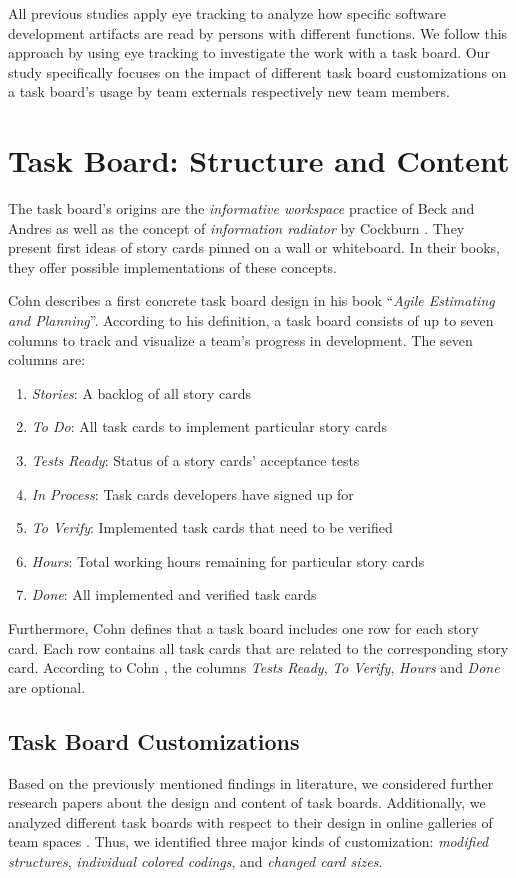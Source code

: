 \documentclass{llncs}
\begin{document}
All previous studies apply eye tracking to analyze how specific software 
development artifacts are read by persons with different functions. We follow 
this approach by using eye tracking to investigate the work with a task board. 
Our study specifically focuses on the impact of different task board 
customizations on a task board's usage by team externals respectively new team 
members.

\section{Task Board: Structure and Content}
\label{sec:task-board}
The task board's origins are the \textit{informative workspace} practice of Beck and Andres \cite{Beck.2007} as well as the concept of \textit{information radiator} by Cockburn \cite{Cockburn.2009}. They present first ideas of story cards pinned on a wall or whiteboard. In their books, they offer possible implementations of these concepts.

Cohn \cite{Cohn.2012} describes a first concrete task board design in his book 
``\textit{Agile Estimating and Planning}''. According to his definition, a task 
board consists of up to seven columns to track and visualize a team's progress 
in development. The seven columns are:
\begin{enumerate}
	\item \textit{Stories}: A backlog of all story cards
	\item \textit{To Do}: All task cards to implement particular story cards
	\item \textit{Tests Ready}: Status of a story cards' acceptance tests
	\item \textit{In Process}: Task cards developers have signed up for
	\item \textit{To Verify}: Implemented task cards that need to be verified
	\item \textit{Hours}: Total working hours remaining for particular story 
	cards
	\item \textit{Done}: All implemented and verified task cards
\end{enumerate}
Furthermore, Cohn \cite{Cohn.2012} defines that a task board includes one row for each story card. Each row contains all task cards that are related to the corresponding story card. According to Cohn \cite{Cohn.2012}, the columns \textit{Tests Ready}, \textit{To Verify}, \textit{Hours} and \textit{Done} are optional.

\subsection{Task Board Customizations}
Based on the previously mentioned findings in literature, we considered further 
research papers about the design and content of task boards. Additionally, we 
analyzed different task boards with respect to their design in online galleries 
of team spaces \cite{XP123, Infoq, Scissor}. Thus, we identified three major 
kinds of customization: \textit{modified structures}, \textit{individual 
colored codings}, and \textit{changed card sizes}.
\end{document}

